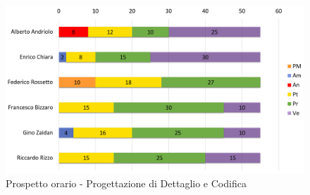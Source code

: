 \begin{figure}[H]
	\centering
	\includegraphics[width= 14cm]{immagini/pdc_istogramma.png}
	\caption{Prospetto orario - Progettazione di Dettaglio e Codifica}
\end{figure}
\newpage

